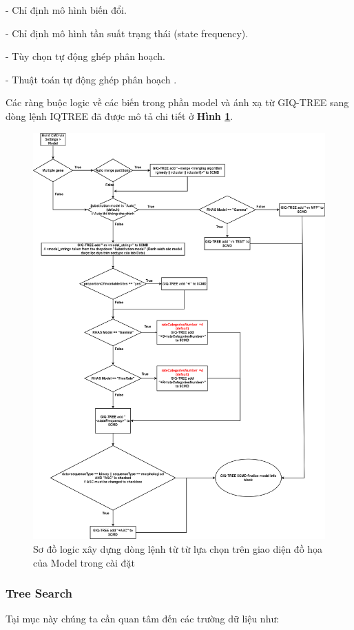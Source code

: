 \documentclass[12pt]{report}
\begin{document}
- Chỉ định mô hình biến đổi.

- Chỉ định mô hình tần suất trạng thái (state frequency).

- Tùy chọn tự động ghép phân hoạch.

- Thuật toán tự động ghép phân hoạch .

Các ràng buộc logic về các biến trong phần model và  ánh xạ từ GIQ-TREE sang dòng lệnh IQTREE đã được mô tả chi tiết ở \textbf{Hình \ref{fig:image4.9}}.

\begin{figure}[h]
	\centering
	\includegraphics[scale=0.3]{Image/4.9.png}
	\caption{Sơ đồ logic xây dựng dòng lệnh từ từ lựa chọn trên giao diện đồ họa của Model trong cài đặt }
	\label{fig:image4.9}
\end{figure}

\subsubsection{Tree Search}
Tại mục này chúng ta cần quan tâm đến các trường dữ liệu như:
\end{document}
